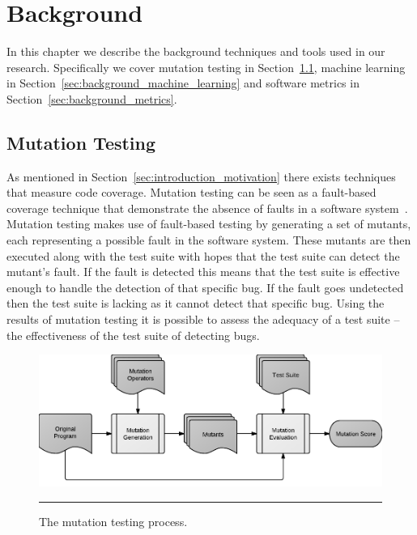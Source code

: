 \chapter{Background}
\label{chap:background}
In this chapter we describe the background techniques and tools used in our research. Specifically we cover mutation testing in Section~\ref{sec:background_mutation_testing}, machine learning in Section~\ref{sec:background_machine_learning} and software metrics in Section~\ref{sec:background_metrics}.


\section{Mutation Testing}
\label{sec:background_mutation_testing}
As mentioned in Section~\ref{sec:introduction_motivation} there exists techniques that measure code coverage. Mutation testing can be seen as a fault-based coverage technique that demonstrate the absence of faults in a software system~\cite{DLS78, BSLS80}. Mutation testing makes use of fault-based testing by generating a set of mutants, each representing a possible fault in the software system. These mutants are then executed along with the test suite with hopes that the test suite can detect the mutant's fault. If the fault is detected this means that the test suite is effective enough to handle the detection of that specific bug. If the fault goes undetected then the test suite is lacking as it cannot detect that specific bug. Using the results of mutation testing it is possible to assess the adequacy of a test suite -- the effectiveness of the test suite of detecting bugs.

\begin{figure}[t!]
  \centering
  \includegraphics[width=14cm]{figures/mutation_testing_overview.pdf}
  \caption{The mutation testing process.}
  \label{fig:mutation_testing_overview}
  \vspace{2mm}
  \hrule
\end{figure}

